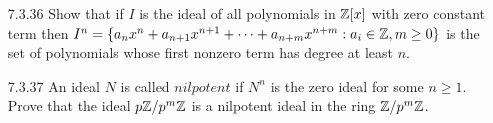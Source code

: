 \begin{enumerate}
\begin{enumerate}
                  \end{enumerate}
   \item[7.3.36]  Show that if $I$ is the ideal of all polynomials in $\mathbb{Z}[x]$
                  with zero constant term then $I^n = \{a_nx^n + a_{n+1}x^{n+1} 
                  + \cdots + a_{n+m}x^{n+m} : a_i \in \mathbb{Z}, m \ge 0\}$ is the set
                  of polynomials whose first nonzero term has degree at least
                  $n$.
   \item[7.3.37]  An ideal $N$ is called $\textit{nilpotent}$ if $N^n$ is the
                  zero ideal for some $n \ge 1$. Prove that the ideal
                  $p\mathbb{Z}/p^m\mathbb{Z}$ is a nilpotent ideal in the ring $\mathbb{Z}/p^m\mathbb{Z}$.
\end{enumerate}
